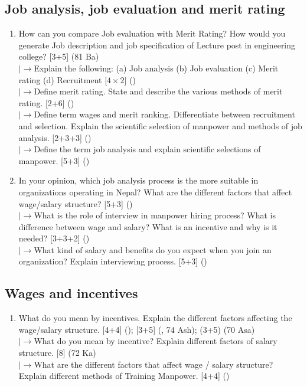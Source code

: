\documentclass[12pt]{article}
\newcommand{\lb}{\\$\left|\rightarrow\right.$}
\begin{document}
  \subsection{Job analysis, job evaluation and merit rating}
    \begin{enumerate}[topsep=0pt, noitemsep]
      \item How can you compare Job evaluation with Merit Rating? How would you generate Job description and job specification of Lecture post in engineering college? \hfill [3+5] (81 Ba)
        \lb Explain the following: (a) Job analysis (b) Job evaluation (c) Merit rating (d) Recruitment \hfill [$4\times2$] ()
        \lb Define merit rating. State and describe the various methods of merit rating. \hfill [2+6] ()
        \lb Define term wages and merit ranking. Differentiate between recruitment and selection. Explain the scientific selection of manpower and methods of job analysis. \hfill [2+3+3] ()
        \lb Define the term job analysis and explain scientific selections of manpower. \hfill [5+3] ()

      \item In your opinion, which job analysis process is the more suitable in organizations operating in Nepal? What are the different factors that affect wage/salary structure? \hfill [5+3] ()
        \lb What is the role of interview in manpower hiring process? What is difference between wage and salary? What is an incentive and why is it needed? \hfill [3+3+2] ()
        \lb What kind of salary and benefits do you expect when you join an organization? Explain interviewing process. \hfill [5+3] ()
    \end{enumerate}

  \subsection{Wages and incentives}
    \begin{enumerate}[topsep=0pt, noitemsep]
      \item What do you mean by incentives. Explain the different factors affecting the wage/salary structure. \hfill [4+4] (); [3+5] (, 74 Ash); (3+5) (70 Asa)
        \lb What do you mean by incentive? Explain different factors of salary structure. \hfill [8] (72 Ka)
        \lb What are the different factors that affect wage / salary structure? Explain different methods of Training Manpower. \hfill [4+4] ()
    \end{enumerate}
\end{document}
